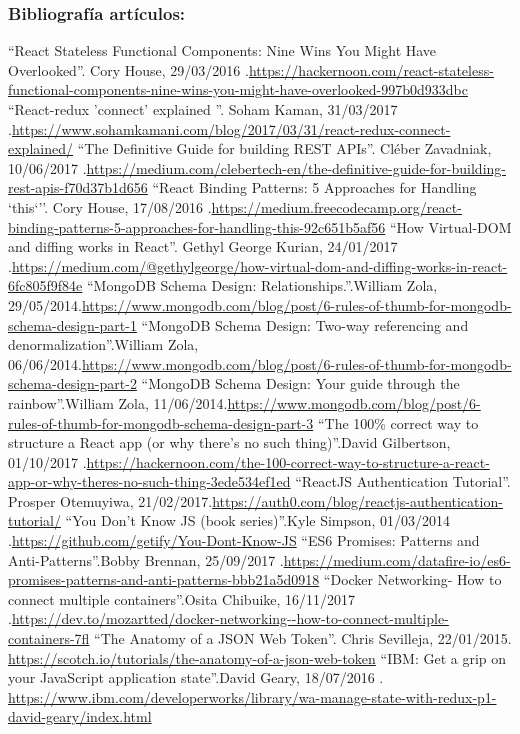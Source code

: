 
\subsubsection*{Bibliografía artículos:}

\bibitem{} ``React Stateless Functional Components: Nine Wins You Might Have Overlooked''. Cory House, 29/03/2016 .\url{https://hackernoon.com/react-stateless-functional-components-nine-wins-you-might-have-overlooked-997b0d933dbc}
\bibitem{} ``React-redux 'connect' explained ''. Soham Kaman, 31/03/2017 .\url{https://www.sohamkamani.com/blog/2017/03/31/react-redux-connect-explained/}
\bibitem{} ``The Definitive Guide for building REST APIs''. Cléber Zavadniak, 10/06/2017 .\url{https://medium.com/clebertech-en/the-definitive-guide-for-building-rest-apis-f70d37b1d656}
\bibitem{} ``React Binding Patterns: 5 Approaches for Handling `this`''. Cory House, 17/08/2016 .\url{https://medium.freecodecamp.org/react-binding-patterns-5-approaches-for-handling-this-92c651b5af56}
\bibitem{} ``How Virtual-DOM and diffing works in React''. Gethyl George Kurian, 24/01/2017 .\url{https://medium.com/@gethylgeorge/how-virtual-dom-and-diffing-works-in-react-6fc805f9f84e}
\bibitem{} ``MongoDB Schema Design: Relationships.''.William Zola, 29/05/2014.\url{https://www.mongodb.com/blog/post/6-rules-of-thumb-for-mongodb-schema-design-part-1}
\bibitem{} ``MongoDB Schema Design: Two-way referencing and denormalization''.William Zola, 06/06/2014.\url{https://www.mongodb.com/blog/post/6-rules-of-thumb-for-mongodb-schema-design-part-2}
\bibitem{} ``MongoDB Schema Design: Your guide through the rainbow''.William Zola, 11/06/2014.\url{https://www.mongodb.com/blog/post/6-rules-of-thumb-for-mongodb-schema-design-part-3}
\bibitem{} ``The 100\% correct way to structure a React app (or why there’s no such thing)''.David Gilbertson, 01/10/2017 .\url{https://hackernoon.com/the-100-correct-way-to-structure-a-react-app-or-why-theres-no-such-thing-3ede534ef1ed}
\bibitem{} ``ReactJS Authentication Tutorial''. Prosper Otemuyiwa, 21/02/2017.\url{https://auth0.com/blog/reactjs-authentication-tutorial/}
\bibitem{} ``You Don't Know JS (book series)''.Kyle Simpson, 01/03/2014 .\url{https://github.com/getify/You-Dont-Know-JS}
\bibitem{} ``ES6 Promises: Patterns and Anti-Patterns''.Bobby Brennan, 25/09/2017 .\url{https://medium.com/datafire-io/es6-promises-patterns-and-anti-patterns-bbb21a5d0918}
\bibitem{} ``Docker Networking- How to connect multiple containers''.Osita Chibuike, 16/11/2017 .\url{https://dev.to/mozartted/docker-networking--how-to-connect-multiple-containers-7fl}
\bibitem{} ``The Anatomy of a JSON Web Token''. Chris Sevilleja, 22/01/2015. \url{https://scotch.io/tutorials/the-anatomy-of-a-json-web-token}
\bibitem{} ``IBM: Get a grip on your JavaScript application state''.David Geary, 18/07/2016 . \url{https://www.ibm.com/developerworks/library/wa-manage-state-with-redux-p1-david-geary/index.html}

